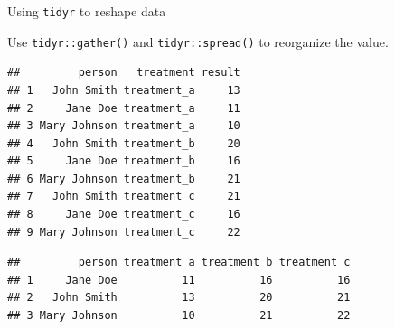 \documentclass[14pt,ignorenonframetext,]{bredelebeamer}
\newenvironment{Shaded}{\begin{snugshade}}{\end{snugshade}}
\newcommand{\KeywordTok}[1]{\textcolor[rgb]{0.94,0.87,0.69}{#1}}
\newcommand{\DataTypeTok}[1]{\textcolor[rgb]{0.87,0.87,0.75}{#1}}
\newcommand{\DecValTok}[1]{\textcolor[rgb]{0.86,0.86,0.80}{#1}}
\newcommand{\StringTok}[1]{\textcolor[rgb]{0.80,0.58,0.58}{#1}}
\newcommand{\OperatorTok}[1]{\textcolor[rgb]{0.94,0.94,0.82}{#1}}
\newcommand{\NormalTok}[1]{\textcolor[rgb]{0.80,0.80,0.80}{#1}}
\begin{document}
\begin{frame}[fragile]{Using \texttt{tidyr} to reshape data}

Use \texttt{tidyr::gather()} and \texttt{tidyr::spread()} to reorganize
the value.

\begin{Shaded}
\end{Shaded}

\begin{verbatim}
##         person   treatment result
## 1   John Smith treatment_a     13
## 2     Jane Doe treatment_a     11
## 3 Mary Johnson treatment_a     10
## 4   John Smith treatment_b     20
## 5     Jane Doe treatment_b     16
## 6 Mary Johnson treatment_b     21
## 7   John Smith treatment_c     21
## 8     Jane Doe treatment_c     16
## 9 Mary Johnson treatment_c     22
\end{verbatim}

\begin{Shaded}
\end{Shaded}

\begin{verbatim}
##         person treatment_a treatment_b treatment_c
## 1     Jane Doe          11          16          16
## 2   John Smith          13          20          21
## 3 Mary Johnson          10          21          22
\end{verbatim}

\end{frame}
\end{document}
